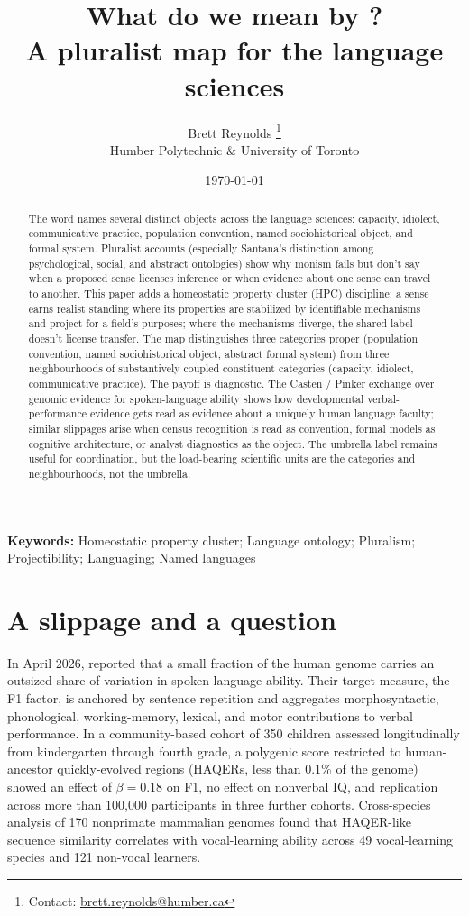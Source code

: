 \documentclass[12pt]{article}
\title{What do we mean by \mention{language}? \\
  \large A pluralist map for the language sciences}
\author{Brett Reynolds \orcidlink{0000-0003-0073-7195}%
\thanks{Contact: \href{mailto:brett.reynolds@humber.ca}{brett.reynolds@humber.ca}}\\
Humber Polytechnic \& University of Toronto}
\date{\today}
\begin{document}
\maketitle

\begin{abstract}
The word  names several distinct objects across the language sciences: capacity, idiolect, communicative practice, population convention, named sociohistorical object, and formal system. Pluralist accounts (especially Santana's distinction among psychological, social, and abstract ontologies) show why monism fails but don't say when a proposed sense licenses inference or when evidence about one sense can travel to another. This paper adds a homeostatic property cluster (HPC) discipline: a sense earns realist standing where its properties are stabilized by identifiable mechanisms and project for a field's purposes; where the mechanisms diverge, the shared label doesn't license transfer. The map distinguishes three categories proper (population convention, named sociohistorical object, abstract formal system) from three neighbourhoods of substantively coupled constituent categories (capacity, idiolect, communicative practice). The payoff is diagnostic. The Casten / Pinker exchange over genomic evidence for spoken-language ability shows how developmental verbal-performance evidence gets read as evidence about a uniquely human language faculty; similar slippages arise when census recognition is read as convention, formal models as cognitive architecture, or analyst diagnostics as the object. The umbrella label remains useful for coordination, but the load-bearing scientific units are the categories and neighbourhoods, not the umbrella.
\end{abstract}

\noindent\textbf{Keywords:} Homeostatic property cluster; Language ontology; Pluralism; Projectibility; Languaging; Named languages

\medskip

\section{A slippage and a question}\label{sec:intro}

In April 2026, \textcite{casten2026} reported that a small fraction of the human genome carries an outsized share of variation in spoken language ability. Their target measure, the F1 factor, is anchored by sentence repetition and aggregates morphosyntactic, phonological, working-memory, lexical, and motor contributions to verbal performance. In a community-based cohort of 350 children assessed longitudinally from kindergarten through fourth grade, a polygenic score restricted to human-ancestor quickly-evolved regions (HAQERs, less than 0.1\% of the genome) showed an effect of $\beta = 0.18$ on F1, no effect on nonverbal IQ, and replication across more than 100,000 participants in three further cohorts. Cross-species analysis of 170 nonprimate mammalian genomes found that HAQER-like sequence similarity correlates with vocal-learning ability across 49 vocal-learning species and 121 non-vocal learners.
\end{document}
